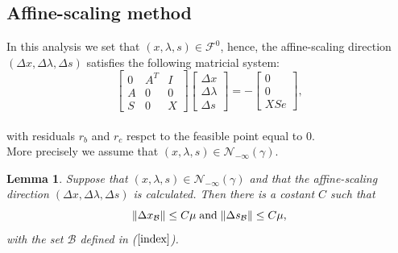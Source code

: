 \documentclass[a4paper,10 pt,titlepage,twoside]{book}
\theoremstyle{plain}
\newtheorem{lem}[thm]{Lemma}
\theoremstyle{definition}
\theoremstyle{remark}
\begin{document}
\subsection{Affine-scaling method}
In this analysis we set that $(x, \lambda, s)\in\mathcal{F}^{0}$, hence, the affine-scaling direction $(\Delta x, \Delta \lambda, \Delta s)$ satisfies the following matricial system:\\
\begin{equation}\label{5.1}
\begin{bmatrix}
0&A^{T}&I \\A&0&0\\S&0&X
\end{bmatrix}\begin{bmatrix}
\Delta x\\\Delta\lambda \\\Delta s
\end{bmatrix}=-\begin{bmatrix}
0\\0\\XSe
\end{bmatrix},
\end{equation}\\
with residuals $r_{b}$ and $r_{c}$ respct to the feasible point equal to 0.\\
More precisely we assume that $(x, \lambda, s)\in\mathcal{N}_{- \infty}(\gamma)$.
\begin{lem}
	Suppose that $(x, \lambda, s)\in\mathcal{N}_{- \infty}(\gamma)$ and that the affine-scaling direction $(\Delta x,\Delta \lambda, \Delta s)$ is calculated. Then there is a costant $C$ such that
	\begin{equation*}
	\lVert \Delta x_{\mathcal{B}} \rVert \leq C \mu \text{\;and\;} \lVert \Delta s_\mathcal{B} \rVert \leq C \mu,
	\end{equation*}
	with the set $\mathcal{B}$ defined in ($\ref{index}$). 
\end{lem}
\end{document}
